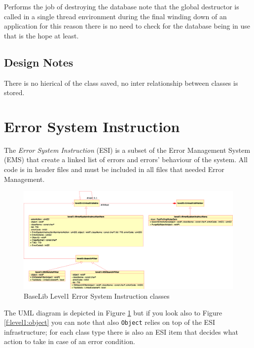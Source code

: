 Performs the job of destroying the database note that the global destructor is called in a single thread environment during the final winding down of an application for this reason there is no need to check for the database being in use that is the hope at least.



\subsection{Design Notes}
There is no hierical of the class saved, no inter relationship between classes is stored.



\section{Error System Instruction}
The \textit{Error System Instruction} (ESI) is a subset of the Error Management System (EMS) that create a linked list of errors and errors' behaviour of the system. All code is in header files and must be included in all files that needed Error Management.

\begin{figure}[h!]
 \begin{center}
  \includegraphics[width=\textwidth]{level1/level1-ESI.eps}
  \caption{BaseLib Level1 Error System Instruction classes}
  \label{f:level1:esi}
 \end{center}
\end{figure}

The UML diagram is depicted in Figure \ref{f:level1:esi} but if you look also to Figure \ref{f:level1:object} you can note that also \texttt{Object} relies on top of the ESI infrastructure; for each class type there is also an ESI item that decides what action to take in case of an error condition.\\

